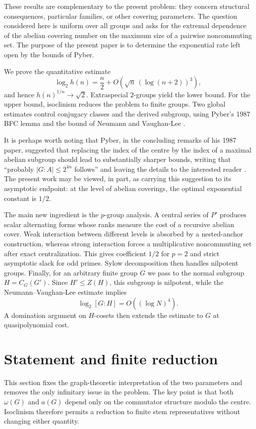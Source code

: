 \documentclass[11pt]{article}
\theoremstyle{definition}
\theoremstyle{remark}
\begin{document}
These results are complementary to the present problem: they concern structural consequences, particular families, or other covering parameters. The question considered here is uniform over all groups and asks for the extremal dependence of the abelian covering number on the maximum size of a pairwise noncommuting set. The purpose of the present paper is to determine the exponential rate left open by the bounds of Pyber.

We prove the quantitative estimate
\[
\log_2 h(n)=\frac n2+O\!\left(\sqrt n\,(\log(n+2))^3\right),
\]
and hence $h(n)^{1/n}\to\sqrt2$. Extraspecial $2$-groups yield the lower bound. For the upper bound, isoclinism reduces the problem to finite groups. Two global estimates control conjugacy classes and the derived subgroup, using Pyber's 1987 BFC lemma and the bound of Neumann and Vaughan-Lee \cite{NeumannVaughanLee1977}.

It is perhaps worth noting that Pyber, in the concluding remarks of his 1987 paper, suggested that replacing the index of the centre by the index of a maximal abelian subgroup should lead to substantially sharper bounds, writing that ``probably $|G:A|\le 2^{4n}$ follows'' and leaving the details to the interested reader \cite{Pyber1987}. The present work may be viewed, in part, as carrying this suggestion to its asymptotic endpoint: at the level of abelian coverings, the optimal exponential constant is $1/2$.

The main new ingredient is the $p$-group analysis. A central series of $P'$ produces scalar alternating forms whose ranks measure the cost of a recursive abelian cover. Weak interaction between different levels is absorbed by a nested-anchor construction, whereas strong interaction forces a multiplicative noncommuting set after exact centralization. This gives coefficient $1/2$ for $p=2$ and strict asymptotic slack for odd primes. Sylow decomposition then handles nilpotent groups. Finally, for an arbitrary finite group $G$ we pass to the normal subgroup $H=C_G(G')$. Since $H'\le Z(H)$, this subgroup is nilpotent, while the Neumann--Vaughan-Lee estimate implies
\[
\log_2 [G:H]=O((\log N)^4).
\]
A domination argument on $H$-cosets then extends the estimate to $G$ at quasipolynomial cost.

\section{Statement and finite reduction}

This section fixes the graph-theoretic interpretation of the two parameters and removes the only infinitary issue in the problem. The key point is that both $\omega(G)$ and $a(G)$ depend only on the commutator structure modulo the centre. Isoclinism therefore permits a reduction to finite stem representatives without changing either quantity.
\end{document}
